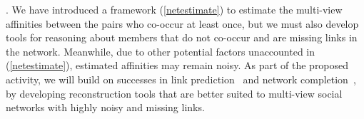 






. We have introduced a framework (\ref{netestimate}) to estimate the multi-view affinities between the pairs who co-occur at least once, but we must also develop tools for reasoning about members that do not co-occur and are missing links in the network. Meanwhile, due to other potential factors unaccounted in (\ref{netestimate}), estimated affinities may remain noisy.  As part of the proposed activity, we will build on successes in link prediction~\cite{Goldberg,Liben-Nowell,TaskarWAK03} and network completion~\cite{Clauset,Guimera,HannekeX09,KimL11}, by developing reconstruction tools that are better suited to multi-view social networks with highly noisy and missing links.


